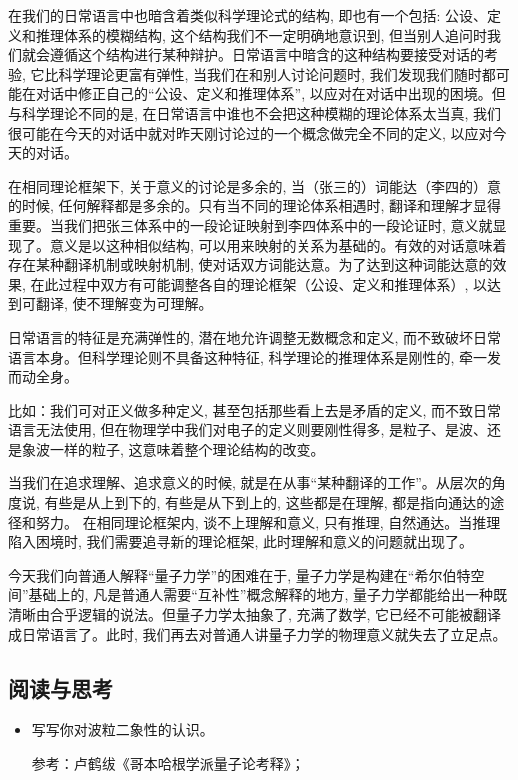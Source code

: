 在我们的日常语言中也暗含着类似科学理论式的结构, 即也有一个包括:
公设、定义和推理体系的模糊结构, 这个结构我们不一定明确地意识到,
但当别人追问时我们就会遵循这个结构进行某种辩护。日常语言中暗含的这种结构要接受对话的考验,
它比科学理论更富有弹性, 当我们在和别人讨论问题时,
我们发现我们随时都可能在对话中修正自己的``公设、定义和推理体系'',
以应对在对话中出现的困境。但与科学理论不同的是,
在日常语言中谁也不会把这种模糊的理论体系太当真,
我们很可能在今天的对话中就对昨天刚讨论过的一个概念做完全不同的定义,
以应对今天的对话。

在相同理论框架下, 关于意义的讨论是多余的,
当（张三的）词能达（李四的）意的时候,
任何解释都是多余的。只有当不同的理论体系相遇时,
翻译和理解才显得重要。当我们把张三体系中的一段论证映射到李四体系中的一段论证时,
意义就显现了。意义是以这种相似结构,
可以用来映射的关系为基础的。有效的对话意味着存在某种翻译机制或映射机制,
使对话双方词能达意。为了达到这种词能达意的效果,
在此过程中双方有可能调整各自的理论框架（公设、定义和推理体系）,
以达到可翻译, 使不理解变为可理解。

日常语言的特征是充满弹性的, 潜在地允许调整无数概念和定义,
而不致破坏日常语言本身。但科学理论则不具备这种特征,
科学理论的推理体系是刚性的, 牵一发而动全身。

比如：我们可对正义做多种定义, 甚至包括那些看上去是矛盾的定义,
而不致日常语言无法使用, 但在物理学中我们对电子的定义则要刚性得多,
是粒子、是波、还是象波一样的粒子, 这意味着整个理论结构的改变。

当我们在追求理解、追求意义的时候,
就是在从事``某种翻译的工作''。从层次的角度说, 有些是从上到下的,
有些是从下到上的, 这些都是在理解, 都是指向通达的途径和努力。
在相同理论框架内, 谈不上理解和意义, 只有推理,
自然通达。当推理陷入困境时, 我们需要追寻新的理论框架,
此时理解和意义的问题就出现了。

今天我们向普通人解释``量子力学''的困难在于,
量子力学是构建在``希尔伯特空间''基础上的,
凡是普通人需要``互补性''概念解释的地方,
量子力学都能给出一种既清晰由合乎逻辑的说法。但量子力学太抽象了,
充满了数学, 它已经不可能被翻译成日常语言了。此时,
我们再去对普通人讲量子力学的物理意义就失去了立足点。



\subsection*{阅读与思考}

\begin{itemize}
    \item 写写你对波粒二象性的认识。

参考：卢鹤绂《哥本哈根学派量子论考释》；




\end{itemize}
